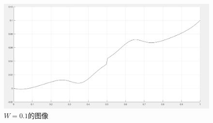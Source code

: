 \documentclass[11pt,UTF8]{ctexart}
\begin{document}
    \begin{figure}[h]
        \includegraphics[width=\textwidth]{W=01.png}
        \caption{$W=0.1$的图像}
    \end{figure}
\end{document}
